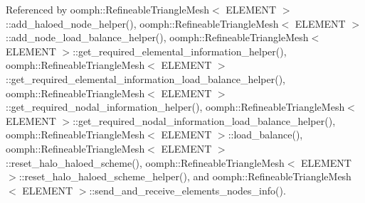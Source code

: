 Referenced by oomph\+::\+Refineable\+Triangle\+Mesh$<$ E\+L\+E\+M\+E\+N\+T $>$\+::add\+\_\+haloed\+\_\+node\+\_\+helper(), oomph\+::\+Refineable\+Triangle\+Mesh$<$ E\+L\+E\+M\+E\+N\+T $>$\+::add\+\_\+node\+\_\+load\+\_\+balance\+\_\+helper(), oomph\+::\+Refineable\+Triangle\+Mesh$<$ E\+L\+E\+M\+E\+N\+T $>$\+::get\+\_\+required\+\_\+elemental\+\_\+information\+\_\+helper(), oomph\+::\+Refineable\+Triangle\+Mesh$<$ E\+L\+E\+M\+E\+N\+T $>$\+::get\+\_\+required\+\_\+elemental\+\_\+information\+\_\+load\+\_\+balance\+\_\+helper(), oomph\+::\+Refineable\+Triangle\+Mesh$<$ E\+L\+E\+M\+E\+N\+T $>$\+::get\+\_\+required\+\_\+nodal\+\_\+information\+\_\+helper(), oomph\+::\+Refineable\+Triangle\+Mesh$<$ E\+L\+E\+M\+E\+N\+T $>$\+::get\+\_\+required\+\_\+nodal\+\_\+information\+\_\+load\+\_\+balance\+\_\+helper(), oomph\+::\+Refineable\+Triangle\+Mesh$<$ E\+L\+E\+M\+E\+N\+T $>$\+::load\+\_\+balance(), oomph\+::\+Refineable\+Triangle\+Mesh$<$ E\+L\+E\+M\+E\+N\+T $>$\+::reset\+\_\+halo\+\_\+haloed\+\_\+scheme(), oomph\+::\+Refineable\+Triangle\+Mesh$<$ E\+L\+E\+M\+E\+N\+T $>$\+::reset\+\_\+halo\+\_\+haloed\+\_\+scheme\+\_\+helper(), and oomph\+::\+Refineable\+Triangle\+Mesh$<$ E\+L\+E\+M\+E\+N\+T $>$\+::send\+\_\+and\+\_\+receive\+\_\+elements\+\_\+nodes\+\_\+info().

